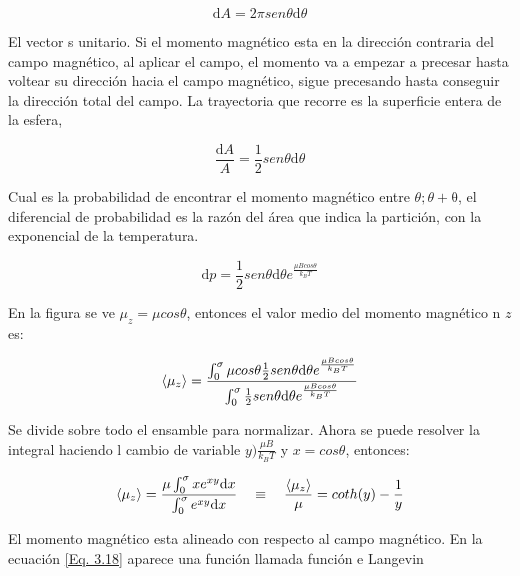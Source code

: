 \documentclass[11pt,fleqn]{book}
\begin{document}
\begin{equation*}
    \mathrm{d}A=2\pi sen\theta\mathrm{d}\theta
\end{equation*}

El vector s unitario. Si el momento magnético esta en la dirección contraria del campo magnético, al aplicar el campo, el momento va a empezar a precesar hasta voltear su dirección hacia el campo magnético, sigue precesando hasta conseguir la dirección total del campo. La trayectoria que recorre es la superficie entera de la esfera,

\begin{equation*}
    \frac{\mathrm{d}A}{A} =\frac{1}{2} sen \theta\mathrm{d}\theta
\end{equation*}
        
Cual es la probabilidad de encontrar el momento magnético entre $\theta;\theta+\mathrm{\theta}$, el diferencial de probabilidad es la razón del área que indica la partición, con la exponencial de la temperatura.

\begin{equation}
    \mathrm{d}p=\frac{1}{2} sen \theta\mathrm{d}\theta e^{\frac{\mu Bcos\theta}{k_{B}T}}
    \label{Eq. 3.16}
\end{equation}

En la figura se ve $\mu_{z}=\mu cos\theta$, entonces el valor medio del momento magnético n $z$ es:

\begin{equation}
    \braket{\mu_{z}}=\frac{\int_{0}^{\sigma}\mu cos\theta\frac{1}{2} sen \theta\mathrm{d}\theta e^{\frac{\mu Bcos\theta}{k_{B}T}}}{\int_{0}^{\sigma}\frac{1}{2} sen \theta\mathrm{d}\theta e^{\frac{\mu Bcos\theta}{k_{B}T}}}
    \label{Eq. 3.17}
\end{equation}

Se divide sobre todo el ensamble para normalizar. Ahora se puede resolver la integral haciendo l cambio de variable $y)\frac{\mu B}{k_{B}T}$ y $x=cos \theta$, entonces:

\begin{equation}
        \braket{\mu_{z}}=\frac{\mu\int_{0}^{\sigma} xe^{xy}\mathrm{d}x}{\int_{0}^{\sigma}e^{xy}\mathrm{d}x}\quad\equiv\quad\frac{\braket{\mu_{z}}}{\mu}=coth(y)-\frac{1}{y}
    \label{Eq. 3.18}
\end{equation}

El momento magnético esta alineado con respecto al campo magnético. En la ecuación \ref{Eq. 3.18} aparece una función llamada función e Langevin
\end{document}
